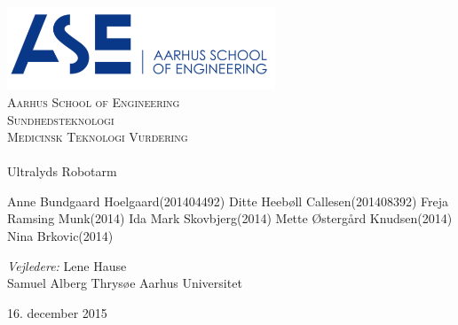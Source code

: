 \begin{titlingpage}
\begin{center}
~ \\[3cm]

\includegraphics[width=0.6\textwidth]{figurer/ASE}~\\[1cm]

\textsc{\LARGE Aarhus School of Engineering}\\[1.5cm]

\textsc{\Large Sundhedsteknologi}\\
\textsc{\Large Medicinsk Teknologi Vurdering }\\[0.5cm]

\noindent\makebox[\linewidth]{\rule{\textwidth}{0.4pt}}\\
[0.5cm]{\Huge Ultralyds Robotarm}
\noindent\makebox[\linewidth]{\rule{\textwidth}{0.4pt}}

\end{center}

Anne Bundgaard Hoelgaard\tab(201404492) \newline
Ditte Heebøll Callesen\tab(201408392) \newline
Freja Ramsing Munk\tab(2014) \newline
Ida Mark Skovbjerg\tab(2014) \newline	
Mette Østergård Knudsen\tab(2014) \newline 
Nina Brkovic\tab(2014) \newline 


\textit{Vejledere:} \newline
Lene Hause\\
Samuel Alberg Thrysøe
Aarhus Universitet

\vfill

\begin{center}
{\large 16. december 2015}
\end{center}

\end{titlingpage}
